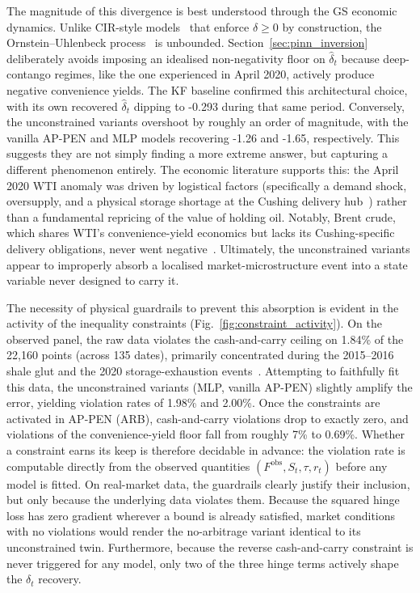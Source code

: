 \documentclass[11pt, a4paper]{article}
\begin{document}
The magnitude of this divergence is best understood through the GS economic dynamics. Unlike CIR-style models~\cite{Liu2009No-ArbitrageStructures} that enforce $\delta \ge 0$ by construction, the Ornstein--Uhlenbeck process~\cite{uhlenbeck1930theory} is unbounded. Section~\ref{sec:pinn_inversion} deliberately avoids imposing an idealised non-negativity floor on $\hat{\delta}_t$ because deep-contango regimes, like the one experienced in April 2020, actively produce negative convenience yields. The KF baseline confirmed this architectural choice, with its own recovered $\hat{\delta}_t$ dipping to -0.293 during that same period. Conversely, the unconstrained variants overshoot by roughly an order of magnitude, with the vanilla AP-PEN and MLP models recovering -1.26 and -1.65, respectively. This suggests they are not simply finding a more extreme answer, but capturing a different phenomenon entirely. The economic literature supports this: the April 2020 WTI anomaly was driven by logistical factors (specifically a demand shock, oversupply, and a physical storage shortage at the Cushing delivery hub~\cite{Burns2022Arbitrage}) rather than a fundamental repricing of the value of holding oil. Notably, Brent crude, which shares WTI's convenience-yield economics but lacks its Cushing-specific delivery obligations, never went negative~\cite{FernandezPerez2022Negative}. Ultimately, the unconstrained variants appear to improperly absorb a localised market-microstructure event into a state variable never designed to carry it.

The necessity of physical guardrails to prevent this absorption is evident in the activity of the inequality constraints (Fig.~\ref{fig:constraint_activity}). On the observed panel, the raw data violates the cash-and-carry ceiling on 1.84\% of the 22,160 points (across 135 dates), primarily concentrated during the 2015--2016 shale glut and the 2020 storage-exhaustion events~\cite{fattouh2016oilfall, gilje2024benchmarks}. Attempting to faithfully fit this data, the unconstrained variants (MLP, vanilla AP-PEN) slightly amplify the error, yielding violation rates of 1.98\% and 2.00\%. Once the constraints are activated in AP-PEN (ARB), cash-and-carry violations drop to exactly zero, and violations of the convenience-yield floor fall from roughly 7\% to 0.69\%. Whether a constraint earns its keep is therefore decidable in advance: the violation rate is computable directly from the observed quantities $(F^{\mathrm{obs}}, S_t, \tau, r_t)$ before any model is fitted. On real-market data, the guardrails clearly justify their inclusion, but only because the underlying data violates them. Because the squared hinge loss has zero gradient wherever a bound is already satisfied, market conditions with no violations would render the no-arbitrage variant identical to its unconstrained twin. Furthermore, because the reverse cash-and-carry constraint is never triggered for any model, only two of the three hinge terms actively shape the $\delta_t$ recovery.
\end{document}
